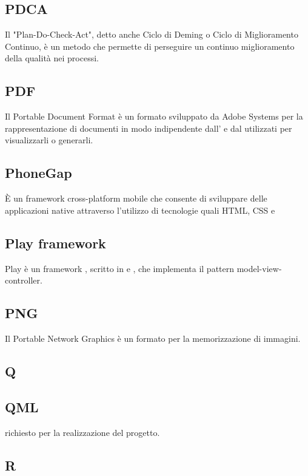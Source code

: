 \subsection*{PDCA}
Il "Plan-Do-Check-Act", detto anche Ciclo di Deming o Ciclo di Miglioramento Continuo,
è un metodo che permette di perseguire un continuo miglioramento della qualità nei processi.

\subsection*{PDF}
Il Portable Document Format è un formato sviluppato da Adobe Systems per la rappresentazione di documenti in modo indipendente dall' e dal  utilizzati per
visualizzarli o generarli.

\subsection*{PhoneGap}
È un framework cross-platform mobile che consente di sviluppare delle applicazioni native attraverso l'utilizzo di tecnologie  quali HTML, CSS e 

\subsection*{Play framework}
Play è un framework , scritto in  e , che implementa il pattern model-view-controller.

\subsection*{PNG}
Il Portable Network Graphics è un formato per la memorizzazione di immagini.

\newpage

\begin{center}
\Huge\section*{\uppercase{Q}}
\end{center}

\subsection*{QML}
 richiesto per la realizzazione del progetto.

\newpage

\begin{center}
\Huge\section*{\uppercase{R}}
\end{center}

